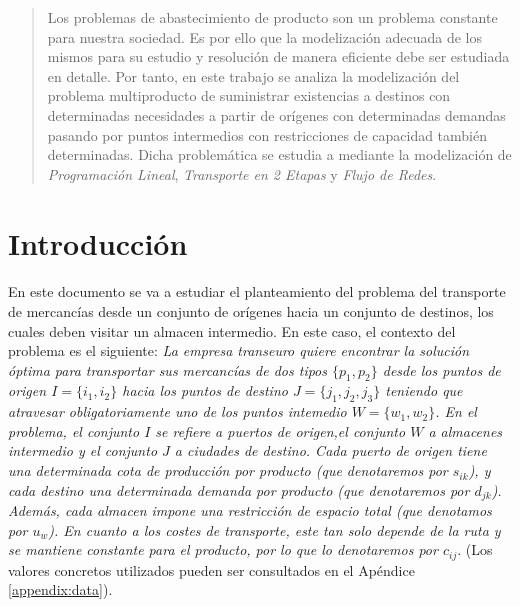 \documentclass[a4paper, spanish]{article}
\begin{document}
  \maketitle

  \begin{abstract}
    \noindent Los problemas de abastecimiento de producto son un problema constante para nuestra sociedad. Es por ello que la modelización adecuada de los mismos para su estudio y resolución de manera eficiente debe ser estudiada en detalle. Por tanto, en este trabajo se analiza la modelización del problema multiproducto de suministrar existencias a destinos con determinadas necesidades a partir de orígenes con determinadas demandas pasando por puntos intermedios con restricciones de capacidad también determinadas. Dicha problemática se estudia a mediante la modelización de \emph{Programación Lineal}, \emph{Transporte en 2 Etapas} y \emph{Flujo de Redes}.
  \end{abstract}


  \section{Introducción}

    \paragraph{}
    En este documento se va a estudiar el planteamiento del problema del transporte de mercancías desde un conjunto de orígenes hacia un conjunto de destinos, los cuales deben visitar un almacen intermedio. En este caso, el contexto del problema es el siguiente: \emph{La empresa transeuro quiere encontrar la solución óptima para transportar sus mercancías de dos tipos $\{p_1, p_2\}$ desde los puntos de origen $I = \{i_1, i_2\}$ hacia los puntos de destino $J = \{j_1, j_2, j_3\}$ teniendo que atravesar obligatoriamente uno de los puntos intemedio $W =\{w_1, w_2\}$. En el problema, el conjunto $I$ se refiere a puertos de origen,el conjunto $W$ a almacenes intermedio y el conjunto $J$ a ciudades de destino. Cada puerto de origen tiene una determinada cota de producción por producto (que denotaremos por $s_{ik}$), y cada destino una determinada demanda por producto (que denotaremos por $d_{jk}$). Además, cada almacen impone una restricción de espacio total (que denotamos por $u_{w}$). En cuanto a los costes de transporte, este tan solo depende de la ruta y se mantiene constante para el producto, por lo que lo denotaremos por $c_{ij}$}. (Los valores concretos utilizados pueden ser consultados en el Apéndice \ref{appendix:data}).
\end{document}
